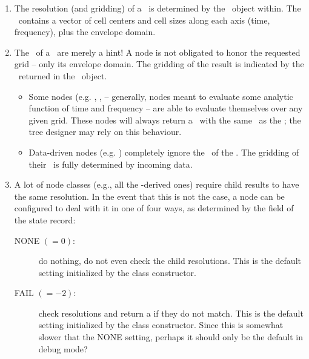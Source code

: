 \documentclass[10pt]{article}
\begin{document}
  \begin{enumerate}
  
  \item The resolution (and gridding) of a \Request\ is determined by the
  \Cells\ object within. The \Cells\ contains a vector of cell centers and cell
  sizes along each axis (time, frequency), plus the envelope domain. 

  \item The \Cells\ of a \Request\ are merely a hint! A node is not obligated
  to honor the requested grid -- only its envelope domain. The gridding of the
  result is indicated by the \Cells\ returned in the \Result\ object.

    \begin{itemize} 

    \item Some nodes (e.g. , ,  -- generally, nodes
    meant to evaluate some analytic function of time and frequency -- are able
    to evaluate themselves over any given grid. These nodes will always return
    a \Result\ with the same \Cells\ as the \Request; the tree designer may
    rely on this behaviour.

    \item Data-driven nodes (e.g. ) completely ignore the \Cells\
    of the \Request. The gridding of their \Result\ is fully determined by
    incoming data.

    \end{itemize}
    
  \item A lot of node classes (e.g., all the -derived ones)
  require child results to have the same resolution. In the event that this is
  not the case, a node can be configured to deal with it in one of four ways,
  as determined by the \qq{auto\_resample} field of the state record:

    \begin{description}
    
    \item[NONE $(=0)$:] do nothing, do not even check the child resolutions. This
    is the default setting initialized by the \qq{Node} class constructor.

    \item[FAIL $(=-2)$:] check resolutions and return a  if they do
    not match. This is the default setting  initialized by the \qq{Function}
    class constructor. Since this is somewhat slower that the NONE setting, 
    perhaps it should only be the default in debug mode?
    

\end{description}
\end{enumerate}
\end{document}
